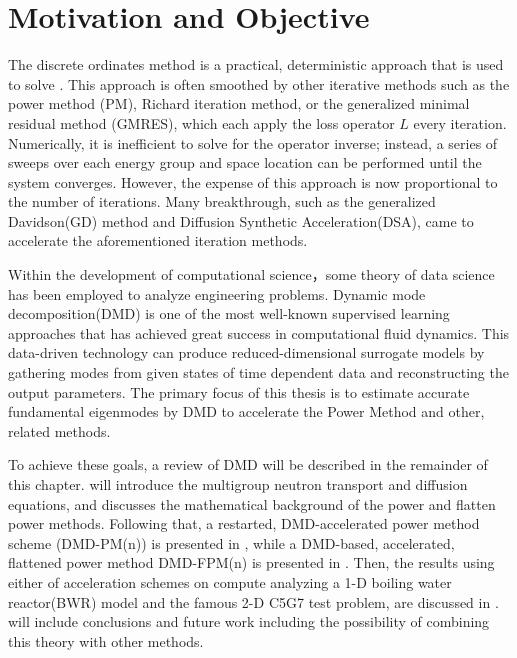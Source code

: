 \section{Motivation and Objective}
The discrete ordinates method is a practical, deterministic approach that is used to solve .
This approach is often smoothed by other iterative methods such as the power method (PM), Richard iteration method, or the generalized minimal residual method (GMRES)\cite{saad1986gmres}, which each apply the loss operator $L$ every iteration.
Numerically, it is inefficient to solve for the operator inverse; instead, a series of sweeps over each energy group and space location can be performed until the system converges.  
However, the expense of this approach is now proportional to the number of iterations.
Many breakthrough, such as the generalized Davidson(GD) method\cite{larsen1984diffusion} and Diffusion Synthetic Acceleration(DSA)\cite{hamilton2011numerical}, came to accelerate the aforementioned iteration methods.

Within the development of computational science，some theory of data science has been employed to analyze engineering problems.
Dynamic mode decomposition(DMD) is one of the most well-known supervised learning approaches that has achieved great success in computational fluid dynamics.
This data-driven technology can produce reduced-dimensional surrogate models by gathering modes from given states of time dependent data and reconstructing the output parameters.
The primary focus of this thesis is to estimate accurate fundamental eigenmodes by DMD to accelerate the Power Method and other, related methods.

To achieve these goals, a review of DMD will be described in the remainder of this chapter.
 will introduce the multigroup neutron transport and diffusion equations, and  discusses the mathematical background of the power and flatten power methods.
Following that, a restarted, DMD-accelerated power method scheme (DMD-PM(n)) is presented in , while a DMD-based, accelerated, flattened power
method DMD-FPM(n) is presented in .
Then, the results using either of acceleration schemes on compute analyzing a 1-D boiling water reactor(BWR) model and the famous 2-D C5G7 test problem, are discussed in .
 will include conclusions and future work including the possibility of combining this theory with other methods. 


